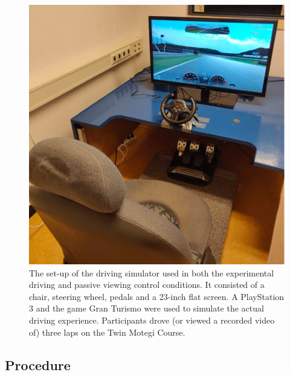 \documentclass[authordate, empirical, issue]{jote-new-article}
\begin{document}
\begin{figure}[t]

  \begin{fullwidth}

    \includegraphics[width=\textwidth]{media/image1.png}
    \caption{The set-up of the driving simulator used in both the experimental driving and passive viewing control conditions. It consisted of a chair, steering wheel, pedals and a 23-inch flat screen. A PlayStation 3 and the game Gran Turismo \parencites{Yamauchi2013} were used to simulate the actual driving experience. Participants drove (or viewed a recorded video of) three laps on the Twin Motegi Course.}
    \label{fig:rId12}
  \end{fullwidth}
\end{figure}


\subsection{Procedure}
\end{document}
